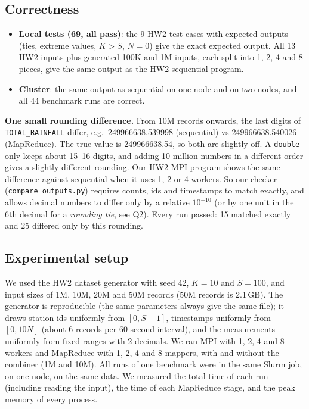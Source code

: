 \documentclass[10pt,a4paper]{article}
\newcommand{\code}[1]{\texttt{#1}}
\begin{document}
\subsection{Correctness}
\begin{itemize}
\item \textbf{Local tests (69, all pass)}: the 9 HW2 test cases with expected outputs (ties, extreme values, $K>S$, $N=0$) give
the exact expected output. All 13 HW2 inputs plus generated 100K and 1M inputs, each split into 1, 2, 4 and 8 pieces, give the
same output as the HW2 sequential program.
\item \textbf{Cluster}: the same output as sequential on one node and on two nodes, and all 44 benchmark runs are correct.
\end{itemize}

\textbf{One small rounding difference.} From 10M records onwards, the last digits of \code{TOTAL\_RAINFALL} differ, e.g.\
249966638.539998 (sequential) vs 249966638.540026 (MapReduce). The true value is 249966638.54, so both are slightly off.
A \code{double} only keeps about 15--16 digits, and adding 10 million numbers in a different order gives a slightly different
rounding. Our HW2 MPI program shows the same difference against sequential when it uses 1, 2 or 4 workers. So our checker
(\code{compare\_outputs.py}) requires counts, ids and timestamps to match exactly, and allows decimal numbers to differ only by a
relative $10^{-10}$ (or by one unit in the 6th decimal for a \emph{rounding tie}, see Q2). Every run passed: 15 matched exactly and
25 differed only by this rounding.

\subsection{Experimental setup}
We used the HW2 dataset generator with seed 42, $K=10$ and $S=100$, and input sizes of 1M, 10M, 20M and 50M records (50M
records is 2.1\,GB). The generator is reproducible (the same parameters always give the same file); it draws station ids
uniformly from $[0,S-1]$, timestamps uniformly from $[0,10N]$ (about 6 records per 60-second interval), and the measurements
uniformly from fixed ranges with 2 decimals. We ran MPI with 1, 2, 4 and 8 workers and MapReduce with 1, 2, 4 and 8 mappers,
with and without the combiner (1M and 10M). All runs of one benchmark were in the same Slurm job, on one node, on the same data. We measured the total time of each run (including reading the input),
the time of each MapReduce stage, and the peak memory of every process.
\end{document}
